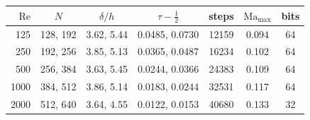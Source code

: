 \begin{tabular}{rcccccc}
$\mathrm{Re}$ & $N$ & $\delta/h$ & $\tau-\tfrac12$ & steps & $\mathrm{Ma}_{\max}$ & bits \\
\hline
125 & 128, 192 & 3.62, 5.44 & 0.0485, 0.0730 & 12159 & 0.094 & 64 \\
250 & 192, 256 & 3.85, 5.13 & 0.0365, 0.0487 & 16234 & 0.102 & 64 \\
500 & 256, 384 & 3.63, 5.45 & 0.0244, 0.0366 & 24383 & 0.109 & 64 \\
1000 & 384, 512 & 3.86, 5.14 & 0.0183, 0.0244 & 32531 & 0.117 & 64 \\
2000 & 512, 640 & 3.64, 4.55 & 0.0122, 0.0153 & 40680 & 0.133 & 32 \\
\end{tabular}

